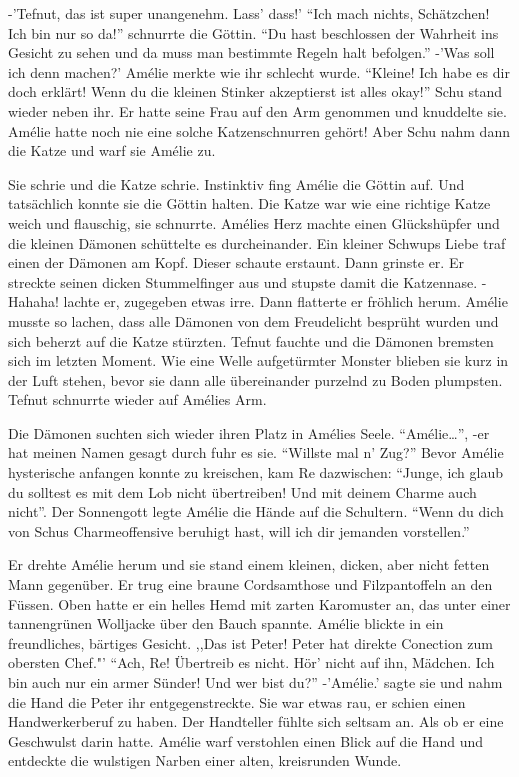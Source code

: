 \documentclass[11pt,titlepage,a5paper]{book}
\begin{document}
-'Tefnut, das ist super unangenehm. Lass' dass!' "`Ich mach nichts, Schätzchen! Ich bin nur so da!"' schnurrte die Göttin. "`Du hast beschlossen der Wahrheit ins Gesicht zu sehen und da muss man bestimmte Regeln halt befolgen."' -'Was soll ich denn machen?' Amélie merkte wie ihr schlecht wurde. "`Kleine! Ich habe es dir doch erklärt! Wenn du die kleinen Stinker akzeptierst ist alles okay!"' Schu stand wieder neben ihr. Er hatte seine Frau auf den Arm genommen und knuddelte sie. Amélie hatte noch nie eine solche Katzenschnurren gehört! Aber Schu nahm dann die Katze und warf sie Amélie zu.

Sie schrie und die Katze schrie. Instinktiv fing Amélie die Göttin auf. Und tatsächlich konnte sie die Göttin halten. Die Katze war wie eine richtige Katze weich und flauschig, sie schnurrte. Amélies Herz machte einen Glückshüpfer und die kleinen Dämonen schüttelte es durcheinander. Ein kleiner Schwups Liebe traf einen der Dämonen am Kopf. Dieser schaute erstaunt. Dann grinste er. Er streckte seinen dicken Stummelfinger aus und stupste damit die Katzennase. -Hahaha! lachte er, zugegeben etwas irre. Dann flatterte er fröhlich herum. Amélie musste so lachen, dass alle Dämonen von dem Freudelicht besprüht wurden und sich beherzt auf die Katze stürzten. Tefnut fauchte und die Dämonen bremsten sich im letzten Moment. Wie eine Welle aufgetürmter Monster blieben sie kurz in der Luft stehen, bevor sie dann alle übereinander purzelnd zu Boden plumpsten. Tefnut schnurrte wieder auf Amélies Arm.

Die Dämonen suchten sich wieder ihren Platz in Amélies Seele. "`Amélie\dots"', -er hat meinen Namen gesagt durch fuhr es sie. "`Willste mal n' Zug?"' Bevor Amélie hysterische anfangen konnte zu kreischen, kam Re dazwischen: "`Junge, ich glaub du solltest es mit dem Lob nicht übertreiben! Und mit deinem Charme auch nicht"'. Der Sonnengott legte Amélie die Hände auf die Schultern. "`Wenn du dich von Schus Charmeoffensive beruhigt hast, will ich dir jemanden vorstellen."' 

Er drehte Amélie herum und sie stand einem kleinen, dicken, aber nicht fetten Mann gegenüber. Er trug eine braune Cordsamthose und Filzpantoffeln an den Füssen. Oben hatte er ein helles Hemd mit zarten Karomuster an, das unter einer tannengrünen Wolljacke über den Bauch spannte. Amélie blickte in ein freundliches, bärtiges Gesicht. ,,Das ist Peter! Peter hat direkte Conection zum obersten Chef."' "`Ach, Re! Übertreib es nicht. Hör' nicht auf ihn, Mädchen. Ich bin auch nur ein armer Sünder! Und wer bist du?"' -'Amélie.' sagte sie und nahm die Hand die Peter ihr entgegenstreckte. Sie war etwas rau, er schien einen Handwerkerberuf zu haben. Der Handteller fühlte sich seltsam an. Als ob er eine Geschwulst darin hatte. Amélie warf verstohlen einen Blick auf die Hand und entdeckte die wulstigen Narben einer alten, kreisrunden Wunde.
\end{document}
